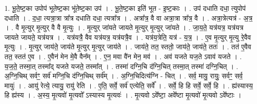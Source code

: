 \documentclass[17pt]{extarticle}
\begin{document}
1. भू॒ते॒ष्ट॒का उपोप॑ भूतेष्ट॒का भू॑तेष्ट॒का उप॑ । . भू॒ते॒ष्ट॒का इति॑ भूत - इ॒ष्ट॒काः । . उप॑ दधाति दधा॒ त्युपोप॑ दधाति । . द॒धा॒ त्यत्रा॒त्रा त्रा᳚त्र दधाति दधा॒ त्यत्रा᳚त्र । . अत्रा᳚त्र॒ वै वा अत्रा॒त्रा त्रा᳚त्र॒ वै । . अत्रा॒त्रेत्यत्र॑ - अ॒त्र॒ । . वै मृ॒त्युर् मृ॒त्युर् वै वै मृ॒त्युः । . मृ॒त्युर् जा॑यते जायते मृ॒त्युर् मृ॒त्युर् जा॑यते । . जा॒य॒ते॒ यत्र॑यत्र॒ यत्र॑यत्र जायते जायते॒ यत्र॑यत्र । . यत्र॑यत्रै॒ वैव यत्र॑यत्र॒ यत्र॑यत्रै॒व । . यत्र॑य॒त्रेति॒ यत्र॑ - य॒त्र॒ । . ए॒व मृ॒त्युर् मृ॒त्यु रे॒वैव मृ॒त्युः । . मृ॒त्युर् जाय॑ते॒ जाय॑ते मृ॒त्युर् मृ॒त्युर् जाय॑ते । . जाय॑ते॒ तत॒ स्ततो॒ जाय॑ते॒ जाय॑ते॒ ततः॑ । . तत॑ ए॒वैव तत॒ स्तत॑ ए॒व । . ए॒वैन॑ मेन मे॒वै वैन᳚म् । . ए॒न॒ मवा वै॑न मेन॒ मव॑ । . अव॑ यजते यज॒ते ऽवाव॑ यजते । . य॒ज॒ते॒ तस्मा॒त् तस्मा᳚द् यजते यजते॒ तस्मा᳚त् । . तस्मा॑ दग्नि॒चि द॑ग्नि॒चित् तस्मा॒त् तस्मा॑ दग्नि॒चित् । . अ॒ग्नि॒चिथ् सर्वꣳ॒॒ सर्व॑ मग्नि॒चि द॑ग्नि॒चिथ् सर्व᳚म् । . अ॒ग्नि॒चिदित्य॑ग्नि - चित् । . सर्व॒ मायु॒ रायुः॒ सर्वꣳ॒॒ सर्व॒ मायुः॑ । . आयु॑ रेत्ये॒ त्यायु॒ रायु॑ रेति । . ए॒ति॒ सर्वे॒ सर्व॑ एत्येति॒ सर्वे᳚ । . सर्वे॒ हि हि सर्वे॒ सर्वे॒ हि । . ह्य॑स्यास्य॒ हि ह्य॑स्य । . अ॒स्य॒ मृ॒त्यवो॑ मृ॒त्यवो᳚ ऽस्यास्य मृ॒त्यवः॑ । . मृ॒त्यवो ऽवे᳚ष्टा॒ अवे᳚ष्टा मृ॒त्यवो॑ मृ॒त्यवो ऽवे᳚ष्टाः । \newline
\end{document}
